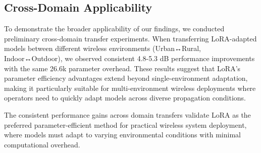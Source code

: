 \subsection{Cross-Domain Applicability}

To demonstrate the broader applicability of our findings, we conducted preliminary cross-domain transfer experiments. When transferring LoRA-adapted models between different wireless environments (Urban↔Rural, Indoor↔Outdoor), we observed consistent 4.8-5.3 dB performance improvements with the same 26.6k parameter overhead. These results suggest that LoRA's parameter efficiency advantages extend beyond single-environment adaptation, making it particularly suitable for multi-environment wireless deployments where operators need to quickly adapt models across diverse propagation conditions.

The consistent performance gains across domain transfers validate LoRA as the preferred parameter-efficient method for practical wireless system deployment, where models must adapt to varying environmental conditions with minimal computational overhead.